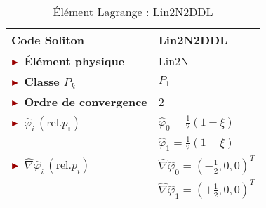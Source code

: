 \begin{table}[H]
\begin{minipage}[t]{0.48\linewidth}
		\centering
		\begin{tabular}{>{\bfseries} l|l}
			\toprule %
			\rowcolor{black!10}\rowstyle{\color{MyRed}\bfseries} Code Soliton & \textcolor{MyRed}{\textbf{Lin2N2DDL}}\\
			\midrule
			$\mytriangle$ Élément physique & \textcolor{MyRed}{Lin2N}\\
			$\mytriangle$ Classe $P_k$ & $P_1$\\
			$\mytriangle$ Ordre de convergence & 2\\
			\midrule
			$\mytriangle$ $\widehat{\varphi}_i\, (\text{rel.} p_i)$ &  $\widehat{\varphi}_0 = \frac{1}{2}(1-\xi)$\\
			&  $\widehat{\varphi}_1 = \frac{1}{2}(1+\xi)$\\
			\midrule
			$\mytriangle$ $\widehat{\nabla}\widehat{\varphi}_i\, (\text{rel.} p_i)$ & $\widehat{\nabla}\widehat{\varphi}_0 = \left(-\frac{1}{2}, 0, 0\right)^T$ \\
			& $\widehat{\nabla}\widehat{\varphi}_1 = \left(+\frac{1}{2}, 0, 0\right)^T$ \\
			\bottomrule %
		\end{tabular}
		\caption{Élément Lagrange : Lin2N2DDL}
		\label{tab:Lin2N2DDL}
	\end{minipage}\hfill
\end{table}

